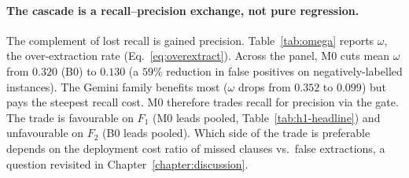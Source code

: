 \paragraph{The cascade is a recall--precision exchange, not pure regression.}
The complement of lost recall is gained precision. Table~\ref{tab:omega} reports
$\omega$, the over-extraction rate (Eq.~\ref{eq:overextract}). Across the panel,
M0 cuts mean $\omega$ from $0.320$ (B0) to $0.130$ (a $59\%$ reduction in
false positives on negatively-labelled instances). The Gemini family benefits
most ($\omega$ drops from $0.352$ to $0.099$) but pays the steepest recall
cost. M0 therefore trades recall for precision via the gate. The trade is
favourable on $F_1$ (M0 leads pooled, Table~\ref{tab:h1-headline}) and
unfavourable on $F_2$ (B0 leads pooled). Which side of the trade is preferable
depends on the deployment cost ratio of missed clauses vs.\ false extractions,
a question revisited in Chapter~\ref{chapter:discussion}.


